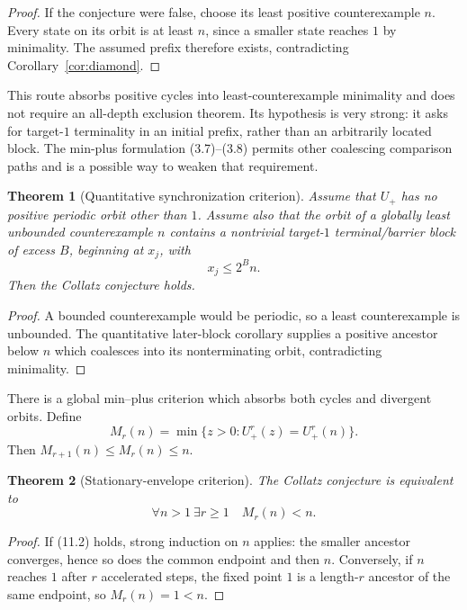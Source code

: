 \documentclass[11pt,reqno]{amsart}
\newtheorem{theorem}{Theorem}[section]
\theoremstyle{remark}
\newcommand{\Up}{U_{+}}
\begin{document}
\begin{proof}
If the conjecture were false, choose its least positive counterexample $n$.
Every state on its orbit is at least $n$, since a smaller state reaches $1$
by minimality.  The assumed prefix therefore exists, contradicting
Corollary~\ref{cor:diamond}.
\end{proof}

This route absorbs positive cycles into least-counterexample minimality and
does not require an all-depth exclusion theorem.  Its hypothesis is very
strong: it asks for target-$1$ terminality in an initial prefix, rather than
an arbitrarily located block.  The min-plus formulation (3.7)--(3.8) permits
other coalescing comparison paths and is a possible way to weaken that
requirement.

\begin{theorem}[Quantitative synchronization criterion]\label{thm:conditional}
Assume that $\Up$ has no positive periodic orbit other than $1$.  Assume also
that the orbit of a globally least unbounded counterexample $n$ contains a
nontrivial target-$1$ terminal/barrier block of excess $B$, beginning at
$x_j$, with
\[
 x_j\le2^Bn.                                          \tag{11.1}
\]
Then the Collatz conjecture holds.
\end{theorem}

\begin{proof}
A bounded counterexample would be periodic, so a least counterexample is
unbounded.  The quantitative later-block corollary supplies a positive
ancestor below $n$ which coalesces into its nonterminating orbit, contradicting
minimality.
\end{proof}

There is a global min--plus criterion which absorbs both cycles and divergent
orbits.  Define
\[
 M_r(n)=\min\{z>0:\Up^r(z)=\Up^r(n)\}.
\]
Then $M_{r+1}(n)\le M_r(n)\le n$.

\begin{theorem}[Stationary-envelope criterion]\label{thm:envelope}
The Collatz conjecture is equivalent to
\[
 \forall n>1\ \exists r\ge1\quad M_r(n)<n.           \tag{11.2}
\]
\end{theorem}

\begin{proof}
If (11.2) holds, strong induction on $n$ applies: the smaller ancestor
converges, hence so does the common endpoint and then $n$.  Conversely, if
$n$ reaches $1$ after $r$ accelerated steps, the fixed point $1$ is a
length-$r$ ancestor of the same endpoint, so $M_r(n)=1<n$.
\end{proof}
\end{document}
